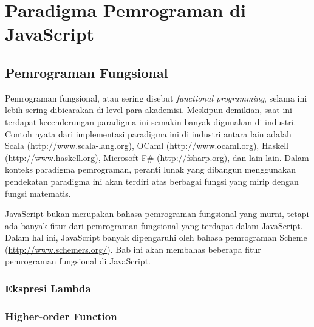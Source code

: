 \chapter{Paradigma Pemrograman di JavaScript}

\section{Pemrograman Fungsional}

Pemrograman fungsional, atau sering disebut \textit{functional programming}, selama ini lebih sering dibicarakan di level para akademisi. Meskipun demikian, saat ini terdapat kecenderungan paradigma ini semakin banyak digunakan di industri. Contoh nyata dari implementasi paradigma ini di industri antara lain adalah Scala (\url{http://www.scala-lang.org}), OCaml (\url{http://www.ocaml.org}), Haskell (\url{http://www.haskell.org}), Microsoft F# (\url{http://fsharp.org}), dan lain-lain. Dalam konteks paradigma pemrograman, peranti lunak yang dibangun menggunakan pendekatan paradigma ini akan terdiri atas berbagai fungsi yang mirip dengan fungsi matematis.

JavaScript bukan merupakan bahasa pemrograman fungsional yang murni, tetapi ada banyak fitur dari pemrograman fungsional yang terdapat dalam JavaScript. Dalam hal ini, JavaScript banyak dipengaruhi oleh bahasa pemrograman Scheme (\url{http://www.schemers.org/}). Bab ini akan membahas beberapa fitur pemrograman fungsional di JavaScript.


\subsection{Ekspresi Lambda}

\subsection{Higher-order Function}

